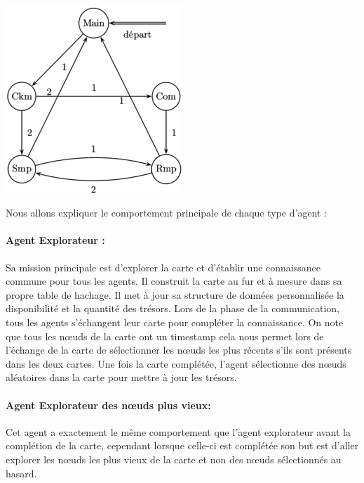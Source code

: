 \documentclass[10pt]{article}
\begin{document}
\begin{center}
	\includegraphics[width=0.5\textwidth]{automate.png}
\end{center}

Nous allons expliquer le comportement principale de chaque type d'agent :
\paragraph{Agent Explorateur :}
Sa mission principale est d'explorer la carte et d'établir une connaissance commune pour tous les agents. Il construit la carte au fur et à mesure dans sa propre table de hachage. Il met à jour sa structure de données personnalisée la disponibilité et la quantité des trésors. Lors de la phase de la communication, tous les agents s'échangent leur carte pour compléter la connaissance. On note que tous les nœuds de la carte ont un timestamp cela nous permet lors de l'échange de la carte de sélectionner les nœuds les plus récents s'ils sont présents dans les deux cartes. Une fois la carte complétée, l'agent sélectionne des nœuds aléatoires dans la carte pour mettre à jour les trésors.
\paragraph{Agent Explorateur des nœuds plus vieux:}
Cet agent a exactement le même comportement que l'agent explorateur avant la complétion de la carte, cependant lorsque celle-ci est complétée son but est d'aller explorer les nœuds les plus vieux de la carte et non des nœuds sélectionnés au hasard.
\end{document}
